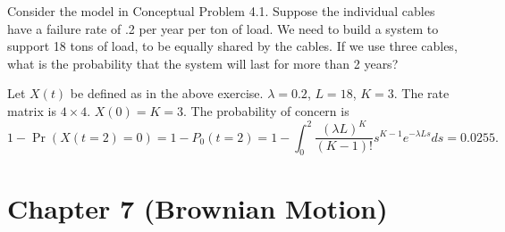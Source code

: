\documentclass[  11pt]{article}
\newcommand{\p}{ {\Pr}}
\begin{document}
\begin{ExerciseList}
Consider the model in Conceptual Problem 4.1. Suppose the individual cables have a failure rate of .2 per year per ton of load. We need to build a system to support 18 tons of load, to be equally shared by the cables. If we use three cables, what is the probability that the system will last for more than 2 years?


\Answer Let   $X(t)$  be defined as in the above exercise. 
$\lambda=0.2$, $L=18$, $K=3$. The rate matrix is $4\times 4$.
$X(0)=K=3$.
The probability of concern is 
\[
1-\p(X(t=2)=0) = 1 -  P_{0}(t=2)=
1-\int_0^2\frac{(\lambda L)^{K}}{(K-1)!}s^{K-1} e^{-\lambda L s}ds
=0.0255.
\]

\end{ExerciseList}


\newpage
\section*{Chapter 7  (Brownian Motion)}
 \setcounter{Exercise}{0}
\end{document}
